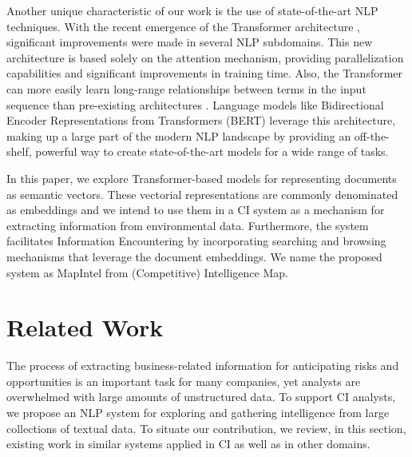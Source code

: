 \documentclass[a4paper]{article}
\begin{document}
Another unique characteristic of our work is the use of state-of-the-art NLP techniques. With the recent emergence of the Transformer architecture \citep{vaswani2017}, significant improvements were made in several NLP subdomains. This new architecture is based solely on the attention mechanism, providing parallelization capabilities and significant improvements in training time. Also, the Transformer can more easily learn long-range relationships between terms in the input sequence than pre-existing architectures \citep{vaswani2017}. Language models like Bidirectional Encoder Representations from Transformers (BERT) \citep{devlin2019} leverage this architecture, making up a large part of the modern NLP landscape by providing an off-the-shelf, powerful way to create state-of-the-art models for a wide range of tasks.

In this paper, we explore Transformer-based models for representing documents as semantic vectors. These vectorial representations are commonly denominated as embeddings and we intend to use them in a CI system as a mechanism for extracting information from environmental data. Furthermore, the system facilitates Information Encountering by incorporating searching and browsing mechanisms that leverage the document embeddings. We name the proposed system as MapIntel from (Competitive) Intelligence Map.

\section{Related Work}
The process of extracting business-related information for anticipating risks and opportunities is an important task for many companies, yet analysts are overwhelmed with large amounts of unstructured data. To support CI analysts, we propose an NLP system for exploring and gathering intelligence from large collections of textual data. To situate our contribution, we review, in this section, existing work in similar systems applied in CI as well as in other domains.
\end{document}
